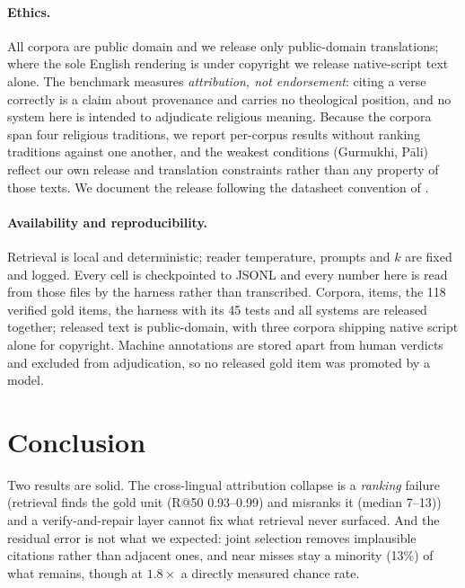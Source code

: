 \documentclass[11pt]{article}
\begin{document}
\paragraph{Ethics.} All corpora are public domain and we release only
public-domain translations; where the sole English rendering is under copyright
we release native-script text alone. The benchmark measures \emph{attribution,
not endorsement}: citing a verse correctly is a claim about provenance and
carries no theological position, and no system here is intended to adjudicate
religious meaning. Because the corpora span four religious traditions, we report per-corpus
results without ranking traditions against one another, and the weakest
conditions (Gurmukhi, P\={a}li) reflect our own release and translation
constraints rather than any property of those texts. We document the release
following the datasheet convention of \citet{gebru2021datasheets}.

\paragraph{Availability and reproducibility.} Retrieval is local and
deterministic; reader temperature, prompts and $k$ are fixed and logged. Every
cell is checkpointed to JSONL and every number here is read from those files by
the harness rather than transcribed. Corpora, items, the 118 verified gold items,
the harness with its 45 tests and all systems are released together; released
text is public-domain, with three corpora shipping native script alone for
copyright. Machine annotations are stored apart from human verdicts and excluded
from adjudication, so no released gold item was promoted by a model.

\section{Conclusion}

Two results are solid. The cross-lingual attribution collapse is a \emph{ranking}
failure (retrieval finds the gold unit (R@50 0.93--0.99) and misranks it (median
7--13)) and a verify-and-repair layer cannot fix what retrieval never surfaced.
And the residual error is not what we expected: joint selection removes
implausible citations rather than adjacent ones, and near misses stay a minority
(13\%) of what remains, though at $1.8\times$ a directly measured chance rate.
\end{document}
